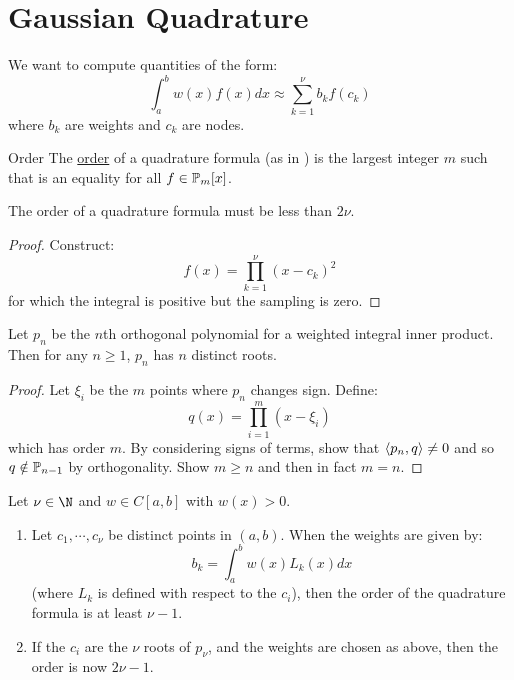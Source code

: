 \documentclass[../Main.tex]{subfiles}
\begin{document}
\section{Gaussian Quadrature}
We want to compute quantities of the form:
\begin{equation}
    \int_{a}^{b} w(x)f(x) dx \approx \sum_{k=1}^{\nu} b_k f(c_k)
    \label{eqnGaussQuadrat}
\end{equation}
where $b_k$ are weights and $c_k$ are nodes.
\begin{definition}{Order}
    The \underline{order} of a quadrature formula (as in ) is the largest integer $m$ such that  is an equality for all $f \in \P_m[x]$.
\end{definition}
\begin{proposition}
    The order of a quadrature formula must be less than $2\nu$.
    \label{propOrderUpperBound}
\end{proposition}
\begin{proof}
    Construct:
    \begin{equation*}
        f(x) = \prod_{k=1}^{\nu} (x - c_k)^2
    \end{equation*}
    for which the integral is positive but the sampling is zero.
\end{proof}
\begin{lemma}
    Let $p_n$ be the $n$th orthogonal polynomial for a weighted integral inner product. Then for any $n \geq 1$, $p_n$ has $n$ distinct roots.
    \label{lemOrthoPolyRoots}
\end{lemma}
\begin{proof}
    Let $\xi_i$ be the $m$ points where $p_n$ changes sign. Define:
    \begin{equation*}
        q(x) = \prod_{i=1}^{m} (x - \xi_i)
    \end{equation*}
    which has order $m$. By considering signs of terms, show that $\inn{p_n}{q} \neq 0$ and so $q \notin \P_{n-1}$ by orthogonality. Show $m \geq n$ and then in fact $m = n$.
\end{proof}
\begin{theorem}
    Let $\nu \in \N$ and $w \in C[a, b]$ with $w(x) > 0$.
    \begin{enumerate}
        \item Let $c_1, \cdots, c_\nu$ be distinct points in $(a, b)$. When the weights are given by:
            \begin{equation*}
                b_k = \int_{a}^{b} w(x)L_k(x) dx 
            \end{equation*}
            (where $L_k$ is defined with respect to the $c_i$), then the order of the quadrature formula is at least $\nu - 1$.
        \item If the $c_i$ are the $\nu$ roots of $p_\nu$, and the weights are chosen as above, then the order is now $2\nu - 1$.
    \end{enumerate}
    \label{thmGaussQuadrat}
\end{theorem}
\end{document}
